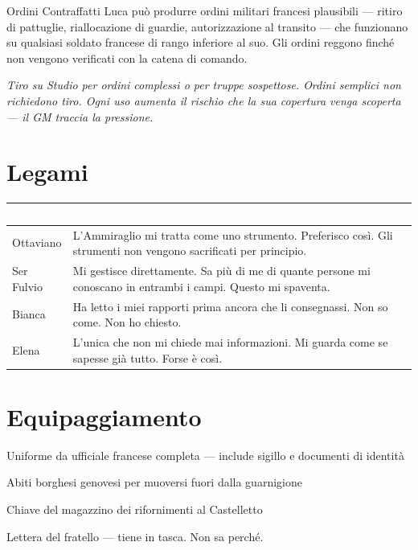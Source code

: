 
\begin{doriabox}{Ordini Contraffatti}
  Luca può produrre ordini militari francesi plausibili — ritiro di pattuglie,
  riallocazione di guardie, autorizzazione al transito — che funzionano
  su qualsiasi soldato francese di rango inferiore al suo.
  Gli ordini reggono finché non vengono verificati con la catena di comando.

  \medskip\noindent\textit{Tiro su Studio per ordini complessi o per truppe
  sospettose. Ordini semplici non richiedono tiro. Ogni uso aumenta il rischio
  che la sua copertura venga scoperta — il GM traccia la pressione.}
\end{doriabox}

\section*{Legami}

\begin{table}[h]
\centering\renewcommand{\arraystretch}{1.4}
\begin{tabularx}{\linewidth}{@{}L{2.4cm} X@{}}
  \toprule{}
  \textcolor{white}{\textbf{PG}} & \textcolor{white}{\textbf{Legame}} \\
  \midrule
  Ottaviano & L'Ammiraglio mi tratta come uno strumento. Preferisco così.
             Gli strumenti non vengono sacrificati per principio. \\
  Ser Fulvio & Mi gestisce direttamente. Sa più di me di quante persone
              mi conoscano in entrambi i campi. Questo mi spaventa. \\
  Bianca & Ha letto i miei rapporti prima ancora che li consegnassi.
           Non so come. Non ho chiesto. \\
  Elena & L'unica che non mi chiede mai informazioni. Mi guarda come
         se sapesse già tutto. Forse è così. \\
  \bottomrule
\end{tabularx}
\end{table}

\section*{Equipaggiamento}
\begin{goldlist}
  \item Uniforme da ufficiale francese completa --- include sigillo e documenti di identità
  \item Abiti borghesi genovesi per muoversi fuori dalla guarnigione
  \item Chiave del magazzino dei rifornimenti al Castelletto
  \item Lettera del fratello --- tiene in tasca. Non sa perché.
\end{goldlist}

